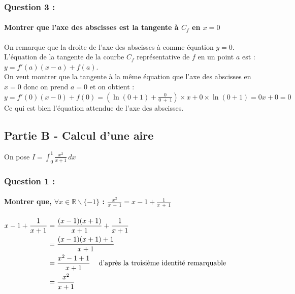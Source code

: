 \documentclass[a4paper, 12pt]{article}
\begin{document}
{}
\subsubsection*{Question 3 :}
\paragraph*{Montrer que l'axe des abscisses est la tangente à $C_f$ en $x=0$ \\[5mm]}

On remarque que la droite de l'axe des abscisses à comme équation $y = 0$.
\\
L'équation de la tangente de la courbe $C_f$ représentative de $f$ en un point $a$ est : 
$y = f'(a)(x-a) + f(a)$.
\\[2mm]
On veut montrer que la tangente à la même équation que l'axe des abscisses en $x=0$ donc on prend $a=0$ et on obtient :
\\
$y = f'(0)(x-0) + f(0) = (\ln{\left( 0 + 1 \right)} + \frac{0}{0\ +\ 1})\times x + 0 \times \ln{\left( 0 + 1 \right)}= 0x + 0 = 0$
\\[2mm]
Ce qui est bien l'équation attendue de l'axe des abscisses.

{}
\subsection*{Partie B - Calcul d'une aire}
\noindent
On pose $I = \displaystyle \int_{0}^{1} \frac{x^2}{x+1} \,dx$

{}
\subsubsection*{Question 1 :}
\paragraph*{Montrer que, $\forall x \in \mathbb{R} \backslash \{-1\}$ : $\frac{x^2}{x\ +\ 1}=x-1 + \frac{1}{x\ +\ 1}$ \\[5mm]}

$
\begin{aligned}
    x-1 + \frac{1}{x+1} 
    &= \frac{(x-1)(x+1)}{x+1}+\frac{1}{x+1} \\
    &= \frac{(x-1)(x+1) + 1}{x+1} \\
    &= \frac{x^2-1+1}{x+1} \text{\hspace{3mm} d'après la troisième identité remarquable} \\
    &= \frac{x^2}{x+1}
\end{aligned}
$
{}
\end{document}
